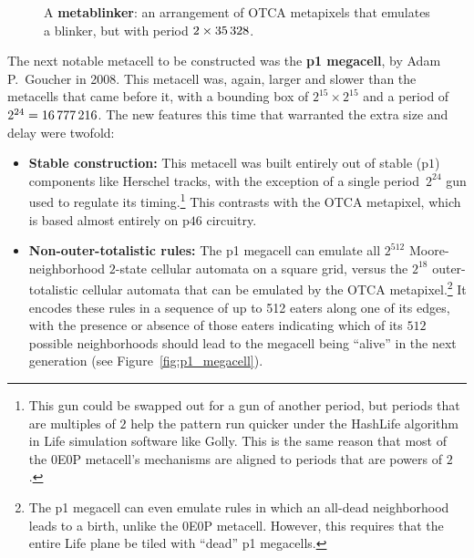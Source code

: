 \begin{figure}[!htb]
	\centering
	\caption{A \textbf{metablinker}: an arrangement of OTCA metapixels that emulates a blinker, but with period $2 \times 35{\,}328$.}\label{fig:metablinker}
\end{figure}

The next notable metacell to be constructed was the \textbf{p1 megacell}, by Adam P.~Goucher in 2008. This metacell was, again, larger and slower than the metacells that came before it, with a bounding box of $2^{15} \times 2^{15}$ and a period of $2^{24} = 16{\,}777{\,}216$. The new features this time that warranted the extra size and delay were twofold:\smallskip

\begin{itemize}
	\item \textbf{Stable construction:} This metacell was built entirely out of stable (p$1$) components like Herschel tracks, with the exception of a single period~$2^{24}$ gun used to regulate its timing.\footnote{This gun could be swapped out for a gun of another period, but periods that are multiples of $2$ help the pattern run quicker under the HashLife algorithm in Life simulation software like Golly. This is the same reason that most of the 0E0P metacell's mechanisms are aligned to periods that are powers of $2$.} This contrasts with the OTCA metapixel, which is based almost entirely on p$46$ circuitry.\smallskip
	
	\item \textbf{Non-outer-totalistic rules:} The p1 megacell can emulate all $2^{512}$ Moore-neighborhood $2$-state cellular automata on a square grid, versus the $2^{18}$ outer-totalistic cellular automata that can be emulated by the OTCA metapixel.\footnote{The p1 megacell can even emulate rules in which an all-dead neighborhood leads to a birth, unlike the 0E0P metacell. However, this requires that the entire Life plane be tiled with ``dead'' p1 megacells.} It encodes these rules in a sequence of up to 512 eaters along one of its edges, with the presence or absence of those eaters indicating which of its $512$ possible neighborhoods should lead to the megacell being ``alive'' in the next generation (see Figure~\ref{fig:p1_megacell}).\smallskip
\end{itemize}

